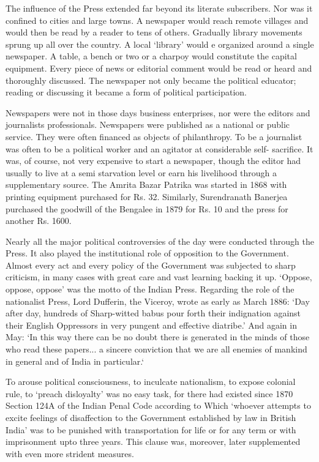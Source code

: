 The influence of the Press extended far beyond its literate subscribers. Nor was it confined to cities and large towns. A newspaper would reach remote villages and would then be read by a reader to tens of others. Gradually library movements sprung up all over the country. A local `library' would e organized around a single newspaper. A table, a bench or two or a charpoy would constitute the capital equipment. Every piece of news or editorial comment would be read or heard and thoroughly discussed. The newspaper not only became the political educator; reading or discussing it became a form of political participation.

Newspapers were not in those days business enterprises, nor were the editors and journalists professionals. Newspapers were published as a national or public service. They were often financed as objects of philanthropy. To be a journalist was often to be a political worker and an agitator at considerable self- sacrifice. It was, of course, not very expensive to start a newspaper, though the editor had usually to live at a semi starvation level or earn his livelihood through a supplementary source. The Amrita Bazar Patrika was started in 1868 with printing equipment purchased for Rs. 32. Similarly, Surendranath Banerjea purchased the goodwill of the Bengalee in 1879 for Rs. 10 and the press for another Rs. 1600.

Nearly all the major political controversies of the day were conducted through the Press. It also played the institutional role of opposition to the Government. Almost every act and every policy of the Government was subjected to sharp criticism, in many cases with great care and vast learning backing it up. `Oppose, oppose, oppose' was the motto of the Indian Press. Regarding the role of the nationalist Press, Lord Dufferin, the Viceroy, wrote as early as March 1886: `Day after day, hundreds of Sharp-witted babus pour forth their indignation against their English Oppressors in very pungent and effective diatribe.' And again in May: `In this way there can be no doubt there is generated in the minds of those who read these papers... a sincere conviction that we are all enemies of mankind in general and of India in particular.`

To arouse political consciousness, to inculcate nationalism, to expose colonial rule, to `preach disloyalty' was no easy task, for there had existed since 1870 Section 124A of the Indian Penal Code according to Which `whoever attempts to excite feelings of disaffection to the Government established by law in British India' was to be punished with transportation for life or for any term or with imprisonment upto three years. This clause was, moreover, later supplemented with even more strident measures.

